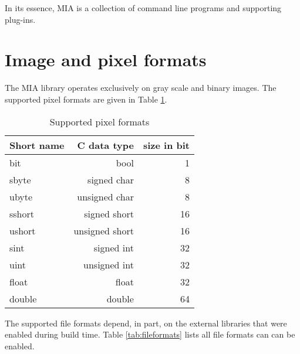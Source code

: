 \documentclass[english, 10pt, a4paper,headsepline,openany]{scrbook}
\begin{document}
In its essence, MIA is a collection of command line programs and supporting plug-ins. 


\section{Image and pixel formats}

The MIA library operates exclusively on gray scale and binary images. 
The supported pixel formats are given in Table \ref{tab:pixform}. 

\begin{table}[h]
\caption{\label{tab:pixform}Supported pixel formats}
\begin{tabular}{lrr}
Short name & C data type & size in bit \\
\hline 
\hline 
bit    & bool          & 1  \\
\hline 
sbyte  & signed char   & 8  \\ 
\hline 
ubyte  & unsigned char & 8  \\ 
\hline 
sshort & signed short  & 16 \\
\hline 
ushort & unsigned short& 16 \\
\hline 
sint   & signed int    & 32 \\
\hline 
uint   & unsigned int  & 32 \\
\hline 
float  & float         & 32 \\
\hline 
double & double        & 64 \\
\hline 
\end{tabular}
\end{table}

The supported file formats depend, in part, on the external libraries that were enabled during build time. 
Table \ref{tab:fileformats} lists all file formats can can be enabled. 
\end{document}
